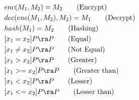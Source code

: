 
\begin{align}
    &enc(M_1, M_2) = M_2 \tag{Encrypt}\\
    &dec(enc(M_1, M_2),M_2) = M_1 \tag{Decrypt}\\
    &hash(M_1) = M_2 \tag{Hashing}\\
    &[x_1 = x_2]P \ra P \tag{Equal}\\
    &[x_1 \neq x_2]P \ra P \tag{Not Equal}\\
    &[x_1 > x_2]P \ra P \tag{Greater}\\
    &[x_1 >= x_2]P \ra P \tag{Greater than}\\
    &[x_1 < x_2]P \ra P \tag{Lesser}\\
    &[x_1 <= x_2]P \ra P \tag{Lesser than}
\end{align}
